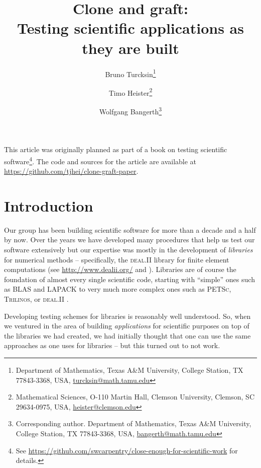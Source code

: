 \documentclass{article}
\newcommand{\dealii}{{\textsc{deal.II}}}
\newcommand{\trilinos}{{\textsc{Trilinos}}}
\newcommand{\petsc}{\textsc{PETSc}}
\begin{document}

\title{Clone and graft:\\ Testing scientific
  applications as they are built}

\author{Bruno Turcksin\footnote{Department of Mathematics, Texas A\&M
    University, College Station, TX 77843-3368, USA, \url{turcksin@math.tamu.edu}}
\and
   Timo Heister\footnote{Mathematical Sciences, O-110 Martin Hall, Clemson University,
     Clemson, SC 29634-0975, USA, \url{heister@clemson.edu}}
\and
   Wolfgang Bangerth\footnote{Corresponding author. Department of Mathematics, Texas A\&M
     University, College Station, TX 77843-3368, USA, \url{bangerth@math.tamu.edu}}}


\maketitle

This article was originally planned as part of a book on testing scientific software\footnote{See \url{https://github.com/swcarpentry/close-enough-for-scientific-work} for details.}. The code and sources for the article are available at \url{https://github.com/tjhei/clone-graft-paper}.

\section{Introduction}

Our group has been building scientific software for more than a decade and a
half by now. Over the years we have developed many procedures that help us
test our software extensively but our expertise was mostly in the development
of \textit{libraries} for numerical methods -- specifically, the \dealii{}
library for finite element computations (see
\url{http://www.dealii.org/} and \cite{BHK07,BK99m}). Libraries are of course the foundation of
almost every single scientific code, starting with ``simple'' ones such as
BLAS and LAPACK to very much more complex ones such as \petsc{}, \trilinos{}, or
\dealii{} \cite{petsc,trilinos,trilinos-web-page}.

Developing testing schemes for libraries is reasonably well understood. So,
when we ventured in the area of building \textit{applications} for scientific purposes
on top of the libraries we had created, we had initially thought that one can
use the same approaches as one uses for libraries -- but this turned out to
not work.
\end{document}
